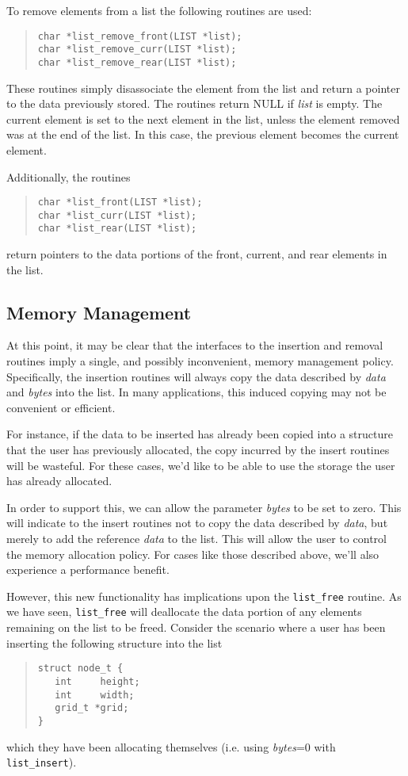 To remove elements from a list the following routines are used:
\begin{quote}
\begin{verbatim}
char *list_remove_front(LIST *list);
char *list_remove_curr(LIST *list);
char *list_remove_rear(LIST *list);
\end{verbatim}
\end{quote}
These routines simply disassociate the element from the list and return
a pointer to the data previously stored.  The routines return NULL if
{\em list} is empty.  The current element is set to the next element in
the list, unless the element removed was at the end of the list.  In this
case, the previous element becomes the current element.

Additionally, the routines
\begin{quote}
\begin{verbatim}
char *list_front(LIST *list);
char *list_curr(LIST *list);
char *list_rear(LIST *list);
\end{verbatim}
\end{quote}
return pointers to the data portions of the front, current, and rear elements
in the list.

\subsection{Memory Management}
At this point, it may be clear that the interfaces to the insertion
and removal routines imply a single, and possibly inconvenient, memory
management policy.  Specifically, the insertion routines will always
copy the data described by {\em data} and {\em bytes} into the list.  In
many applications, this induced copying may not be convenient or efficient.

For instance, if the data to be inserted has already been copied into a
structure that the user has previously allocated, the copy incurred by the
insert routines will be wasteful.  For these cases, we'd like to be able to
use the storage the user has already allocated.

In order to support this, we can allow the parameter {\em bytes} to be set to
zero.  This will indicate to the insert routines not to copy the data
described by {\em data}, but merely to add the reference {\em data} to the
list.  This will allow the user to control the memory allocation policy.  For
cases like those described above, we'll also experience a performance benefit.

However, this new functionality has implications upon the {\tt list\_free}
routine.  As we have seen, {\tt list\_free} will deallocate the data portion
of any elements remaining on the list to be freed.  Consider the scenario
where a user has been inserting the following structure into the list
\begin{quote}
\begin{verbatim}
struct node_t {
   int     height;
   int     width;
   grid_t *grid;
}
\end{verbatim}
\end{quote}
which they have been allocating themselves (i.e. using {\em bytes}=0 with
{\tt list\_insert}).

